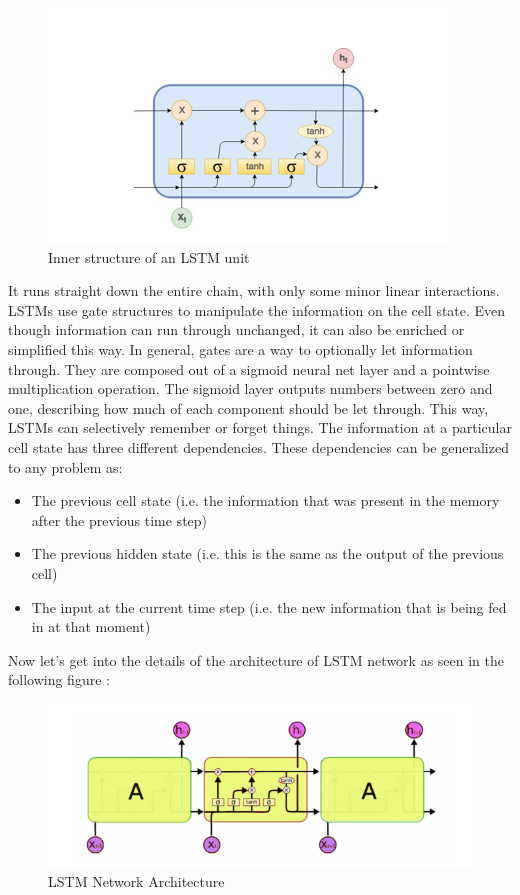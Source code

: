 \begin{figure}[ht!]
\centering
\includegraphics[width=0.7\linewidth]{project/lstm.png}

\caption{Inner structure of an LSTM unit}
\end{figure}
It runs straight down the entire chain, with only some minor linear interactions. LSTMs use gate structures to manipulate the information on the cell state. Even though information can run through unchanged, it can also be enriched or simplified this way. In general, gates are a way to optionally let information through. They are composed out of a sigmoid neural net layer and a pointwise multiplication operation. The sigmoid layer outputs numbers between zero and one, describing how much of each component should be let through. This way, LSTMs can selectively remember or forget things. The information at a particular cell state has three different dependencies.
These dependencies can be generalized to any problem as:
\begin{itemize}
    \item The previous cell state (i.e. the information that was present in the memory after the previous time step)
    \item The previous hidden state (i.e. this is the same as the output of the previous cell)
    \item The input at the current time step (i.e. the new information that is being fed in at that moment)
\end{itemize}
\par Now let’s get into the details of the architecture of LSTM network as seen in the following figure \cite{olah2015understanding}:
\begin{figure}[ht!]
\centering
\includegraphics[width=1\linewidth]{project/archi.png}

\caption{LSTM Network Architecture}
\end{figure}
